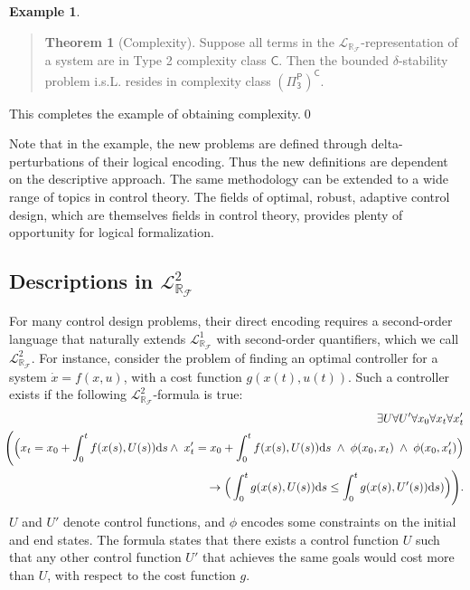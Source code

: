 \documentclass[11pt]{article}
\newcommand{\lrf}{\mathcal{L}_{\mathbb{R}_{\mathcal{F}}}}
\theoremstyle{definition}
\newtheorem{example}{Example}[section]
\newtheorem{theorem}{Theorem}[section]
\begin{document}
\begin{example}
\begin{quote}
\vspace{-.5cm}
\begin{theorem}[Complexity]
Suppose all terms in the $\lrf$-representation of a system are in Type 2 complexity class $\mathsf{C}$.  Then the bounded $\delta$-stability problem i.s.L. resides in complexity class $\mathsf{(\Pi^P_3)^C}$. 
\end{theorem}
\end{quote}
This completes the example of obtaining complexity.\qed
\end{example}
Note that in the example, the new problems are defined through delta-perturbations of their logical encoding. Thus the new definitions are dependent on the descriptive approach. The same methodology can be extended to a wide range of topics in control theory. The fields of optimal, robust, adaptive control design, which are themselves fields in control theory, provides plenty of opportunity for logical formalization.

\subsection{Descriptions in $\lrf^2$}\label{second-order}

For many control design problems, their direct encoding requires a second-order language that naturally extends $\lrf^1$ with second-order quantifiers, which we call $\lrf^2$. For instance, consider the problem of finding an optimal controller for a system $\dot x = f({x}, u)$, with a cost function $g(x(t),u(t))$. Such a controller exists if the following $\lrf^2$-formula is true:
\begin{eqnarray*}
& &\hspace{-.7cm}\exists U \forall U' \forall {x_0}\forall {x_t} \forall {x_t'}\\
& &\hspace{-.7cm}\Bigg( \Big({x_t} = {x_0} + \int_{0}^t f({x}(s),U(s))\mathrm{d}s \wedge\;  x_t' = x_0 + \int_{0}^t f(x(s),U(s))\mathrm{d}s
\;\wedge\; \phi(x_0, x_t) \;\wedge\; \phi(x_0, x_t')\Big)\\
& &\hspace{5.7cm}\rightarrow \Big(\int_0^t g(x(s),U(s))\mathrm{d}s \leq  \int_0^t g(x(s),U'(s))\mathrm{d}s)\Big) \Bigg).
\end{eqnarray*}
$U$ and $U'$ denote control functions, and $\phi$ encodes some constraints on the initial and end states. The formula states that there exists a control function $U$ such that any other control function $U'$ that achieves the same goals would cost more than $U$, with respect to the cost function $g$. 
\end{document}
